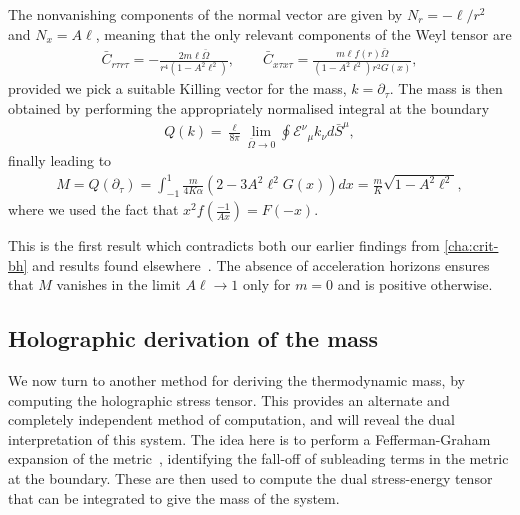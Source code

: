 \documentclass[
twoside,
openright,
frontopenright,
]{dmathesis}
\begin{document}
The nonvanishing components of the normal vector are given by $N_r = -\ell/r^2$
and $N_x = A\ell$, meaning that the only relevant components of the Weyl tensor
are
\begin{align}
  \bar{C}_{r\tau r\tau} = -\frac{2m \ell \bar{\Omega}}{r^4(1-A^2\ell^2)}, \qquad
  \bar{C}_{x\tau x\tau} = \frac{m\ell f(r)\bar{\Omega}}{(1-A^2\ell^2) r^2G(x)},
\end{align}
provided we pick a suitable Killing vector for the mass, $k =
\partial_\tau$. The mass is then obtained by performing the appropriately
normalised integral at the boundary
\begin{align}
Q(k)=\frac{\ell}{8\pi}\lim_{\bar{\Omega} \to 0}\oint
\mathcal{E}^\nu{}_\mu k_{\nu }d\bar{S}^{\mu },
\end{align}
finally leading to
\begin{align}\label{confmass}
M = Q(\partial _{\tau}) =
  \int_{-1}^1\frac{m}{4K\alpha}\left(2-3A^2\ell^2G(x)\right) dx = \frac{m}{K}\sqrt{1-A^2\ell^2},
\end{align}
where we used the fact that $x^2 f(\frac{-1}{Ax}) = F(-x)$.

This is the first result which contradicts both our earlier findings from
\cref{cha:crit-bh} and results found
elsewhere~\cite{Appels:2016uha,Astorino:2016ybm,Appels:2017xoe}. The absence of
acceleration horizons ensures that $M$ vanishes in the limit $A\ell\to 1$ only
for $m=0$ and is positive otherwise.

\subsection{Holographic derivation of the mass}
\label{sec:hologr-deriv-mass}

We now turn to another method for deriving the thermodynamic mass, by computing
the holographic stress tensor. This provides an alternate and completely
independent method of computation, and will reveal the dual interpretation of
this system.  The idea here is to perform a Fefferman-Graham expansion of the
metric~\cite{Fefferman:2007rka}, identifying the fall-off of subleading terms
in the metric at the boundary. These are then used to compute the dual
stress-energy tensor that can be integrated to give the mass of the system.
\end{document}
